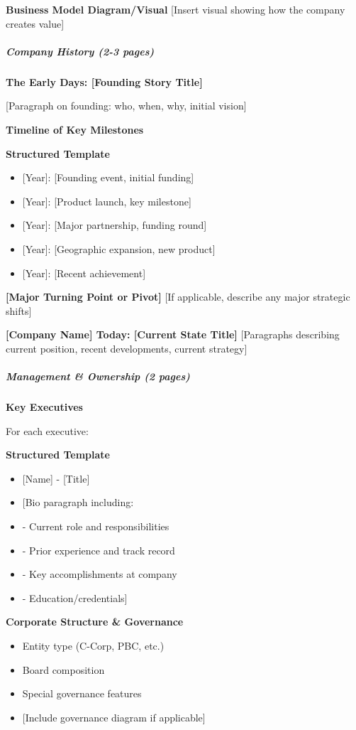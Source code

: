 \documentclass[11pt]{article}
\begin{document}
\textbf{Business Model Diagram/Visual} [Insert visual showing how the company creates value]


\subparagraph{Company History (2-3 pages)}\mbox{}\par

\textbf{The Early Days: [Founding Story Title]}


[Paragraph on founding: who, when, why, initial vision]


\textbf{Timeline of Key Milestones}


\textbf{Structured Template}
\begin{itemize}[leftmargin=*,itemsep=2pt,topsep=2pt]
\item {} [Year]: [Founding event, initial funding]
\item {} [Year]: [Product launch, key milestone]
\item {} [Year]: [Major partnership, funding round]
\item {} [Year]: [Geographic expansion, new product]
\item {} [Year]: [Recent achievement]
\end{itemize}

\textbf{[Major Turning Point or Pivot]} [If applicable, describe any major strategic shifts]


\textbf{[Company Name] Today: [Current State Title]} [Paragraphs describing current position, recent developments, current strategy]


\subparagraph{Management \& Ownership (2 pages)}\mbox{}\par

\textbf{Key Executives}


For each executive:

\textbf{Structured Template}
\begin{itemize}[leftmargin=*,itemsep=2pt,topsep=2pt]
\item {} [Name] - [Title]
\item {} [Bio paragraph including:
\item {} - Current role and responsibilities
\item {} - Prior experience and track record
\item {} - Key accomplishments at company
\item {} - Education/credentials]
\end{itemize}

\textbf{Corporate Structure \& Governance}

\begin{itemize}[leftmargin=*,itemsep=2pt,topsep=2pt]
\item {} Entity type (C-Corp, PBC, etc.)
\item {} Board composition
\item {} Special governance features
\item {} [Include governance diagram if applicable]
\end{itemize}
\end{document}
